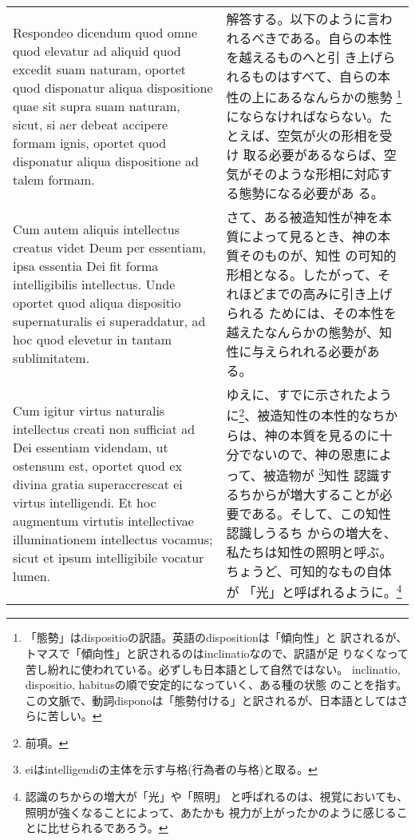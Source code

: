 \documentclass[10pt]{jsarticle} %
\begin{document}
\begin{longtable}{p{21em}p{21em}}
\\


{\sc Respondeo dicendum} quod omne quod elevatur ad aliquid quod
excedit suam naturam, oportet quod disponatur aliqua dispositione quae
sit supra suam naturam, sicut, si aer debeat accipere formam ignis,
oportet quod disponatur aliqua dispositione ad talem formam. 

&


解答する。以下のように言われるべきである。自らの本性を越えるものへと引
き上げられるものはすべて、自らの本性の上にあるなんらかの態勢
\footnote{「態勢」はdispositioの訳語。英語のdispositionは「傾向性」と
訳されるが、トマスで「傾向性」と訳されるのはinclinatioなので、訳語が足
りなくなって苦し紛れに使われている。必ずしも日本語として自然ではない。
inclinatio, dispositio, habitusの順で安定的になっていく、ある種の状態
のことを指す。この文脈で、動詞disponoは「態勢付ける」と訳されるが、日本語としてはさらに苦しい。}にならなければならない。たとえば、空気が火の形相を受け
取る必要があるならば、空気がそのような形相に対応する態勢になる必要があ
る。

\\


Cum autem aliquis intellectus creatus videt Deum per essentiam, ipsa
essentia Dei fit forma intelligibilis intellectus. Unde oportet quod
aliqua dispositio supernaturalis ei superaddatur, ad hoc quod elevetur
in tantam sublimitatem.

&

さて、ある被造知性が神を本質によって見るとき、神の本質そのものが、知性
の可知的形相となる。したがって、それほどまでの高みに引き上げられる
ためには、その本性を越えたなんらかの態勢が、知性に与えられれる必要があ
る。

\\

Cum igitur virtus naturalis intellectus creati
non sufficiat ad Dei essentiam videndam, ut ostensum est, oportet quod
ex divina gratia superaccrescat ei virtus intelligendi. Et hoc
augmentum virtutis intellectivae illuminationem intellectus vocamus;
sicut et ipsum intelligibile vocatur lumen.  

&

ゆえに、すでに示されたように\footnote{前項。}、被造知性の本性的なちか
らは、神の本質を見るのに十分でないので、神の恩恵によって、被造物が
\footnote{eiはintelligendiの主体を示す与格(行為者の与格)と取る。}知性
認識するちからが増大することが必要である。そして、この知性認識しうるち
からの増大を、私たちは知性の照明と呼ぶ。ちょうど、可知的なもの自体が
「光」と呼ばれるように。\footnote{認識のちからの増大が「光」や「照明」
 と呼ばれるのは、視覚においても、照明が強くなることによって、あたかも
 視力が上がったかのように感じることに比せられるであろう。}



\end{longtable}
\end{document}
